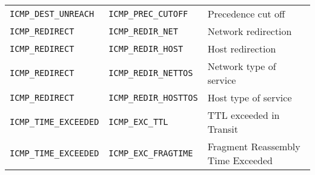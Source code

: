 \documentclass[documentation]{subfiles}
\begin{document}
\begin{longtable}{lll}
    {\tt ICMP\_DEST\_UNREACH}  & {\tt ICMP\_PREC\_CUTOFF}    & Precedence cut off \\
    {\tt ICMP\_REDIRECT}       & {\tt ICMP\_REDIR\_NET}      & Network redirection \\
    {\tt ICMP\_REDIRECT}       & {\tt ICMP\_REDIR\_HOST}     & Host redirection \\
    {\tt ICMP\_REDIRECT}       & {\tt ICMP\_REDIR\_NETTOS}   & Network type of service \\
    {\tt ICMP\_REDIRECT}       & {\tt ICMP\_REDIR\_HOSTTOS}  & Host type of service \\
    {\tt ICMP\_TIME\_EXCEEDED} & {\tt ICMP\_EXC\_TTL}        & TTL exceeded in Transit\\
    {\tt ICMP\_TIME\_EXCEEDED} & {\tt ICMP\_EXC\_FRAGTIME}   & Fragment Reassembly Time Exceeded\\
    \bottomrule
\end{longtable}
\end{document}
